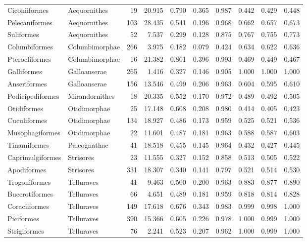 \begin{table}[ht]
\begin{tabular}{llrrrrrrrr}
  Ciconiiformes & Aequornithes &   19 & 20.915 & 0.790 & 0.365 & 0.987 & 0.442 & 0.429 & 0.448 \\ 
  Pelecaniformes & Aequornithes &  103 & 28.435 & 0.541 & 0.196 & 0.968 & 0.662 & 0.657 & 0.673 \\ 
  Suliformes & Aequornithes &   52 & 7.537 & 0.299 & 0.128 & 0.875 & 0.767 & 0.755 & 0.773 \\ 
  Columbiformes & Columbimorphae &  266 & 3.975 & 0.182 & 0.079 & 0.424 & 0.634 & 0.622 & 0.636 \\ 
  Pterocliformes & Columbimorphae &   16 & 21.382 & 0.801 & 0.396 & 0.993 & 0.469 & 0.449 & 0.467 \\ 
  Galliformes & Galloanserae &  265 & 1.416 & 0.327 & 0.146 & 0.905 & 1.000 & 1.000 & 1.000 \\ 
  Anseriformes & Galloanserae &  156 & 13.546 & 0.499 & 0.206 & 0.963 & 0.604 & 0.595 & 0.610 \\ 
  Podicipediformes & Mirandornithes &   18 & 20.335 & 0.552 & 0.170 & 0.972 & 0.489 & 0.492 & 0.505 \\ 
  Otidiformes & Otidimorphae &   25 & 17.148 & 0.608 & 0.208 & 0.980 & 0.414 & 0.405 & 0.423 \\ 
  Cuculiformes & Otidimorphae &  134 & 18.927 & 0.486 & 0.173 & 0.959 & 0.525 & 0.521 & 0.536 \\ 
  Musophagiformes & Otidimorphae &   22 & 11.601 & 0.487 & 0.181 & 0.963 & 0.588 & 0.587 & 0.603 \\ 
  Tinamiformes & Paleognathae &   41 & 18.518 & 0.455 & 0.145 & 0.964 & 0.432 & 0.427 & 0.445 \\ 
  Caprimulgiformes & Strisores &   23 & 11.555 & 0.327 & 0.152 & 0.858 & 0.513 & 0.505 & 0.522 \\ 
  Apodiformes & Strisores &  331 & 18.307 & 0.340 & 0.141 & 0.797 & 0.521 & 0.514 & 0.530 \\ 
  Trogoniformes & Telluraves &   41 & 9.463 & 0.500 & 0.200 & 0.963 & 0.883 & 0.877 & 0.890 \\ 
  Bucerotiformes & Telluraves &   66 & 4.651 & 0.489 & 0.181 & 0.959 & 0.818 & 0.814 & 0.828 \\ 
  Coraciiformes & Telluraves &  149 & 17.618 & 0.676 & 0.343 & 0.983 & 0.999 & 0.998 & 1.000 \\ 
  Piciformes & Telluraves &  390 & 15.366 & 0.605 & 0.226 & 0.978 & 1.000 & 0.999 & 1.000 \\ 
  Strigiformes & Telluraves &   76 & 2.241 & 0.523 & 0.207 & 0.962 & 1.000 & 0.999 & 1.000 \\ 

\end{tabular}
\end{table}
